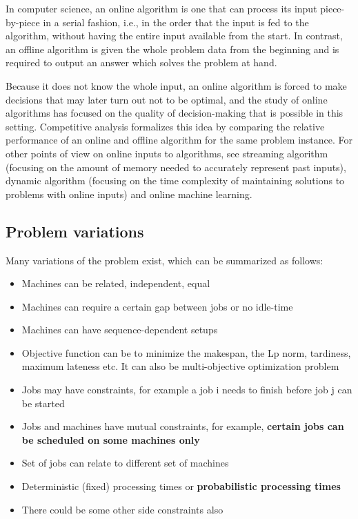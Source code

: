 \documentclass[a4paper,10pt]{article}
\begin{document}
In computer science, an online algorithm is one that can process its input piece-by-piece in a serial fashion, i.e., in the order that the input is fed to the algorithm, without having the entire input available from the start. In contrast, an offline algorithm is given the whole problem data from the beginning and is required to output an answer which solves the problem at hand.

Because it does not know the whole input, an online algorithm is forced to make decisions that may later turn out not to be optimal, and the study of online algorithms has focused on the quality of decision-making that is possible in this setting. Competitive analysis formalizes this idea by comparing the relative performance of an online and offline algorithm for the same problem instance. For other points of view on online inputs to algorithms, see streaming algorithm (focusing on the amount of memory needed to accurately represent past inputs), dynamic algorithm (focusing on the time complexity of maintaining solutions to problems with online inputs) and online machine learning.

\subsection{Problem variations}

Many variations of the problem exist, which can be summarized as follows:
\begin{itemize}
\item Machines can be related, independent, equal
\item Machines can require a certain gap between jobs or no idle-time
\item Machines can have sequence-dependent setups
\item Objective function can be to minimize the makespan, the Lp norm, tardiness, maximum lateness etc. It can also be multi-objective optimization problem
\item Jobs may have constraints, for example a job i needs to finish before job j can be started
\item Jobs and machines have mutual constraints, for example, \textbf{certain jobs can be scheduled on some machines only}
\item Set of jobs can relate to different set of machines
\item Deterministic (fixed) processing times or \textbf{probabilistic processing times}
\item There could be some other side constraints also
\end{itemize}
\end{document}
